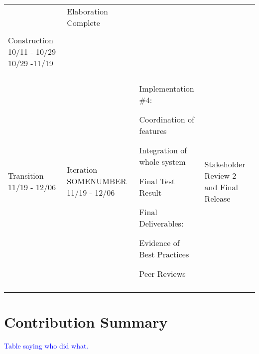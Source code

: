 \documentclass[11pt]{article}
\newenvironment{packed_itemize}{
\begin{itemize}
  \setlength{\itemsep}{1pt}
  \setlength{\parskip}{0pt}
  \setlength{\parsep}{0pt}
}{\end{itemize}}
\begin{document}
\begin{table}
\begin{tabular}{|p{0.9in}|p{0.9in}|p{3.2in}|p{.9in}|}
& Elaboration Complete
\\
& & & \\
\hline
Construction 10/11 - 10/29  10/29 -11/19 &
&& \\
&&& \\
\hline
Transition  11/19 - 12/06 &
Iteration SOMENUMBER 11/19 - 12/06 &
Implementation \#4: 
	\begin{packed_itemize}
		\vspace{-0.15in}
		\item Coordination of features
		\item Integration of whole system
	\end{packed_itemize}
Final Test Result 

Final Deliverables:
	\begin{packed_itemize}
	\vspace{-0.15in}
		\item Evidence of Best Practices
		\item Peer Reviews
	\end{packed_itemize}
	\vspace{-0.4in}
& 
Stakeholder Review 2 and Final Release
\\
&&& \\
\hline
\end{tabular}
\end{table}

\section{Contribution Summary} %
\textcolor{blue}{Table saying who did what.}
\end{document}
